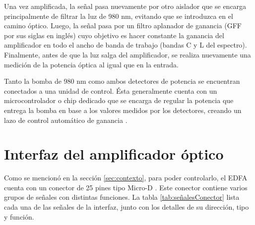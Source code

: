 
Una vez amplificada, la señal pasa nuevamente por otro aislador que se encarga principalmente de filtrar la luz de 980 nm, evitando que se introduzca en el camino óptico. Luego, la señal pasa por un filtro aplanador de ganancia (GFF por sus siglas en inglés) cuyo objetivo es hacer constante la ganancia del amplificador en todo el ancho de banda de trabajo \citep{WEBSITE:EDFA3} (bandas C y L del espectro). Finalmente, antes de que la luz salga del amplificador, se realiza nuevamente una medición de la potencia óptica al igual que en la entrada.

Tanto la bomba de 980 nm como ambos detectores de potencia se encuentran conectados a una unidad de control. Ésta generalmente cuenta con un microcontrolador o chip dedicado que se encarga de regular la potencia que entrega la bomba en base a los valores medidos por los detectores, creando un lazo de control automático de ganancia \citep{WEBSITE:EDFA2}\citep{WEBSITE:EDFA1}.

\section{Interfaz del amplificador óptico}
\label{sec:intAmp}

Como se mencionó en la sección \ref{sec:contexto}, para poder controlarlo, el EDFA cuenta con un conector de 25 pines tipo Micro-D \citep{WEBSITE:MICROD_DS}. Este conector contiene varios grupos de señales con distintas funciones. La tabla \ref{tab:señalesConector} lista cada una de las señales de la interfaz, junto con los detalles de su dirección, tipo y función.

